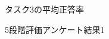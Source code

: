 \documentclass[syuuron]{kuee}
\begin{document}
		\begin{figure}
			\begin{center}
			\end{center}
			\caption{タスク3の平均正答率}
	  		\label{fig:res6}
		\end{figure}
		\begin{figure}
			\begin{center}
			\end{center}
			\caption{5段階評価アンケート結果1}
	  		\label{fig:res7}
		\end{figure}
\end{document}

